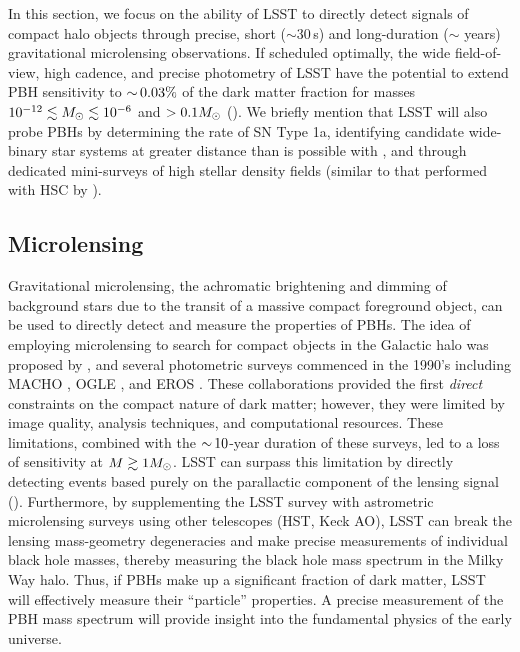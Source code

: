 In this section, we focus on the ability of LSST to directly detect signals of compact halo objects through precise, short ($\sim30\,$s) and long-duration ($\sim$ years) gravitational microlensing observations.
If scheduled optimally, the wide field-of-view, high cadence, and precise photometry of LSST have the potential to extend PBH sensitivity to $ {\sim}\, 0.03\%$ of the dark matter fraction for masses $10^{-12}\lesssim M_\odot \lesssim 10^{-6}$ and $>0.1M_\odot$ ().
We briefly mention that LSST will also probe PBHs by determining the rate of SN Type 1a, identifying candidate wide-binary star systems at greater distance than is possible with \Gaia, and through dedicated mini-surveys of high stellar density fields (similar to that performed with HSC by \citealt{1701.02151}).


\subsection{Microlensing}
\label{sec:microlensing}

Gravitational microlensing, the achromatic brightening and dimming of background stars due to the transit of a massive compact foreground object, can be used to directly detect and measure the properties of PBHs.
The idea of employing microlensing to search for compact objects in the Galactic halo was proposed by \citet{1986ApJ...304....1P}, and several photometric surveys commenced in the 1990's including MACHO \citep{1992ASPC...34..193A}, OGLE \citep{1992AcA....42..253U}, and EROS \citep{1993Msngr..72...20A}.
These collaborations provided the first \emph{direct} constraints on the compact nature of dark matter; however, they were limited by image quality, analysis techniques, and computational resources.
These limitations, combined with the $ {\sim}\,10$-year duration of these surveys, led to a loss of sensitivity at $M \gtrsim 1 M_\odot$.
LSST can surpass this limitation by directly detecting events based purely on the parallactic component of the lensing signal ().
Furthermore, by supplementing the LSST survey with astrometric microlensing surveys using other telescopes (HST, Keck AO), LSST can break the lensing mass-geometry degeneracies and make precise measurements of individual black hole masses, thereby measuring the black hole mass spectrum in the Milky Way halo.
Thus, if PBHs make up a significant fraction of dark matter, LSST will effectively measure their ``particle'' properties. 
A precise measurement of the PBH mass spectrum will provide insight into the fundamental physics of the early universe.

